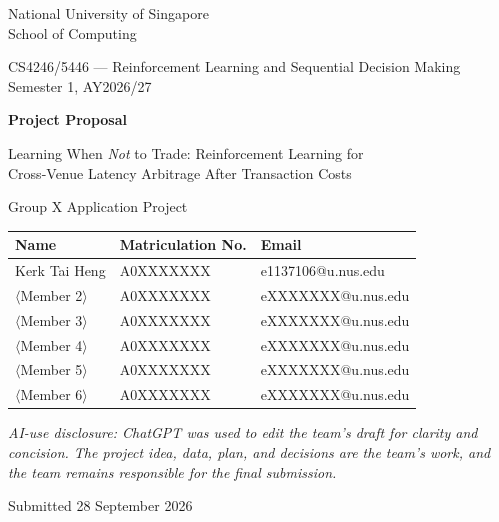 \documentclass[10pt,a4paper]{article}
\begin{document}
\begin{titlepage}
\centering
\vspace*{2cm}
{\large National University of Singapore \\ School of Computing \par}
\vspace{0.4cm}
{\large CS4246/5446 --- Reinforcement Learning and Sequential Decision Making \\
Semester 1, AY2026/27 \par}
\vspace{1.6cm}
{\LARGE\bfseries Project Proposal \par}
\vspace{0.6cm}
{\Large Learning When \emph{Not} to Trade: Reinforcement Learning for \\[2pt]
Cross-Venue Latency Arbitrage After Transaction Costs \par}
\vspace{1.6cm}
{\large Group X \quad\textbar\quad Application Project \par}
\vspace{1.4cm}

\begin{tabular}{@{}lll@{}}
\toprule
\textbf{Name} & \textbf{Matriculation No.} & \textbf{Email} \\
\midrule
Kerk Tai Heng      & A0XXXXXXX & e1137106@u.nus.edu \\
$\langle$Member 2$\rangle$ & A0XXXXXXX & eXXXXXXX@u.nus.edu \\
$\langle$Member 3$\rangle$ & A0XXXXXXX & eXXXXXXX@u.nus.edu \\
$\langle$Member 4$\rangle$ & A0XXXXXXX & eXXXXXXX@u.nus.edu \\
$\langle$Member 5$\rangle$ & A0XXXXXXX & eXXXXXXX@u.nus.edu \\
$\langle$Member 6$\rangle$ & A0XXXXXXX & eXXXXXXX@u.nus.edu \\
\bottomrule
\end{tabular}

\vspace{0.8cm}
{\small\textit{AI-use disclosure: ChatGPT was used to edit the team's draft for clarity
and concision. The project idea, data, plan, and decisions are the team's work, and the
team remains responsible for the final submission.}\par}

\vfill
{\normalsize Submitted 28 September 2026 \par}
\end{titlepage}
\end{document}
